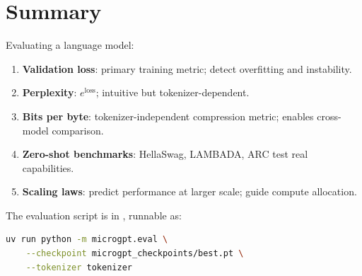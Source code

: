 

\section{Summary}

Evaluating a language model:
\begin{enumerate}
  \item \textbf{Validation loss}: primary training metric; detect overfitting and instability.
  \item \textbf{Perplexity}: $e^{\text{loss}}$; intuitive but tokenizer-dependent.
  \item \textbf{Bits per byte}: tokenizer-independent compression metric; enables cross-model comparison.
  \item \textbf{Zero-shot benchmarks}: HellaSwag, LAMBADA, ARC test real capabilities.
  \item \textbf{Scaling laws}: predict performance at larger scale; guide compute allocation.
\end{enumerate}

The evaluation script is in , runnable as:

\shelltag
\begin{lstlisting}[language=bash]
uv run python -m microgpt.eval \
    --checkpoint microgpt_checkpoints/best.pt \
    --tokenizer tokenizer
\end{lstlisting}
